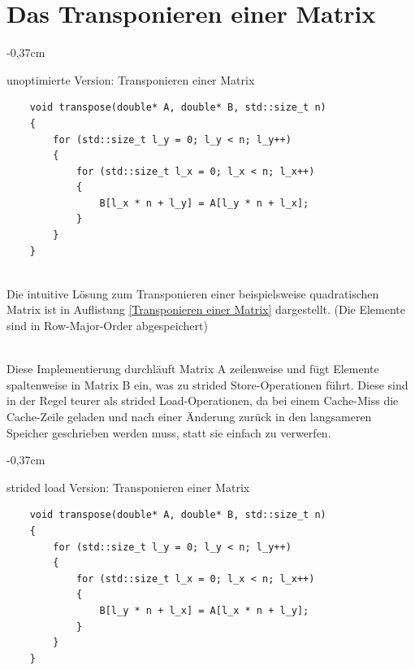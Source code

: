 \documentclass[sigconf,language=ngerman]{acmart}
\begin{document}
\section{Das Transponieren einer Matrix}
\begin{tiny}
    \begin{adjustwidth}{-0,37cm}{}
    \begin{footnotesize}
    \begin{auflistung}
    \caption{unoptimierte Version: Transponieren einer Matrix}
    \label{Transponieren einer Matrix}
    \begin{verbatim}
    void transpose(double* A, double* B, std::size_t n)
    {
        for (std::size_t l_y = 0; l_y < n; l_y++)
        {
            for (std::size_t l_x = 0; l_x < n; l_x++)
            {
                B[l_x * n + l_y] = A[l_y * n + l_x];
            }
        }
    }
        
    \end{verbatim}
    \end{auflistung}
    \end{footnotesize}
    \end{adjustwidth}
    \end{tiny}




Die intuitive Lösung zum Transponieren einer beispielsweise quadratischen Matrix ist in Auflistung \ref{Transponieren einer Matrix} dargestellt.
(Die Elemente sind in Row-Major-Order abgespeichert)

\,\\
Diese Implementierung durchläuft Matrix A zeilenweise und fügt Elemente spaltenweise in Matrix B ein,
was zu strided Store-Operationen führt. Diese sind in der Regel teurer als strided Load-Operationen,
da bei einem Cache-Miss die Cache-Zeile geladen und nach einer Änderung 
zurück in den langsameren Speicher geschrieben werden muss, statt sie einfach zu verwerfen.



\begin{tiny}
    \begin{adjustwidth}{-0,37cm}{}
    \begin{footnotesize}
    \begin{auflistung}
    \caption{strided load Version: Transponieren einer Matrix}
    \label{Transponieren einer Matrix strided load}
    \begin{verbatim}
    void transpose(double* A, double* B, std::size_t n)
    {
        for (std::size_t l_y = 0; l_y < n; l_y++)
        {
            for (std::size_t l_x = 0; l_x < n; l_x++)
            {
                B[l_y * n + l_x] = A[l_x * n + l_y];
            }
        }
    }
        
    \end{verbatim}
    \end{auflistung}
    \end{footnotesize}
    \end{adjustwidth}
    \end{tiny}
\end{document}
